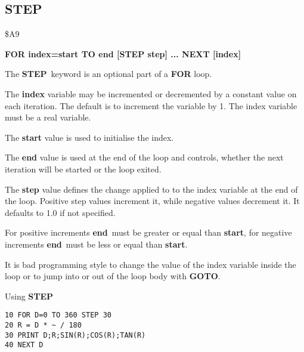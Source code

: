 \subsection{STEP}
\begin{description}[leftmargin=2cm,style=nextline]
\item [Token:] \$A9
\item [Format:] {\bf FOR index=start TO end [STEP step] ... NEXT [index]}
\item [Usage:] The {\bf STEP} keyword is an optional part of a
               {\bf FOR} loop.

               The {\bf index} variable may be incremented or decremented
               by a constant value on each iteration. The default
               is to increment the variable by 1.
               The index variable must be a real variable.

               The {\bf start} value is used to initialise the index.

               The {\bf end} value is used at the end of the loop
               and controls, whether the next iteration will be started
               or the loop exited.

               The {\bf step} value defines the change applied to
               to the index variable at the end of the loop.
               Positive step values increment it, while negative values
               decrement it. It defaults to 1.0 if not specified.

\item [Remarks:] For positive increments {\bf end} must be greater
               or equal than {\bf start}, for negative increments
               {\bf end} must be less or equal than {\bf start}.

               It is bad programming style to change the value
               of the index variable inside the loop or to
               jump into or out of the loop body with {\bf GOTO}.

\item [Example:] Using {\bf STEP}
\begin{tcolorbox}[colback=black,coltext=white]
\verbatimfont{\codefont}
\begin{verbatim}
10 FOR D=0 TO 360 STEP 30
20 R = D * ~ / 180
30 PRINT D;R;SIN(R);COS(R);TAN(R)
40 NEXT D
\end{verbatim}
\end{tcolorbox}
\end{description}

